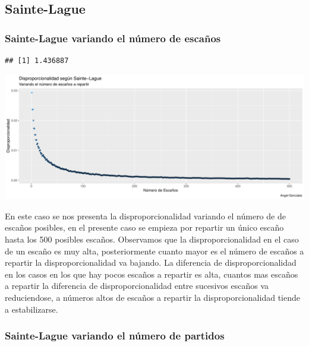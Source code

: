 \documentclass[12pt,a4paper,]{book}
\numberwithin{dummy}{section}
\theoremstyle{ocrenumbox}
\theoremstyle{blacknumex}
\theoremstyle{blacknumbox}
\theoremstyle{ocrenum}
\theoremstyle{ocrenum}
\begin{document}
\hypertarget{sainte-lague}{%
\subsection{Sainte-Lague}\label{sainte-lague}}

\hypertarget{sainte-lague-variando-el-nuxfamero-de-escauxf1os}{%
\subsubsection{Sainte-Lague variando el número de
escaños}\label{sainte-lague-variando-el-nuxfamero-de-escauxf1os}}

\begin{verbatim}
## [1] 1.436887
\end{verbatim}

\begin{center}\includegraphics[width=0.95\linewidth]{figurasR/unnamed-chunk-14-1} \end{center}

En este caso se nos presenta la disproporcionalidad variando el número
de de escaños posibles, en el presente caso se empieza por repartir un
único escaño hasta los 500 posibles escaños. Observamos que la
disproporcionalidad en el caso de un escaño es muy alta, posteriormente
cuanto mayor es el número de escaños a repartir la disproporcionalidad
va bajando. La diferencia de disproporcionalidad en los casos en los que
hay pocos escaños a repartir es alta, cuantos mas escaños a repartir la
diferencia de disproporcionalidad entre sucesivos escaños va
reduciendose, a números altos de escaños a repartir la
disproporcionalidad tiende a estabilizarse.

\hypertarget{sainte-lague-variando-el-nuxfamero-de-partidos}{%
\subsubsection{Sainte-Lague variando el número de
partidos}\label{sainte-lague-variando-el-nuxfamero-de-partidos}}
\end{document}
